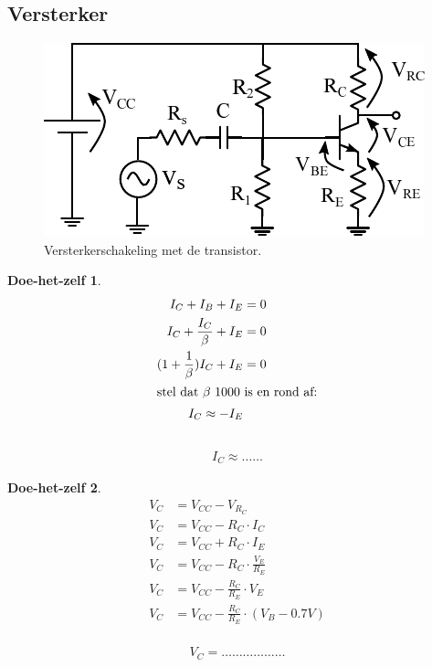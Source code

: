 \documentclass{article}
\newtheorem{DIY}{Doe-het-zelf}
\begin{document}
\subsection{Versterker}
		\begin{figure}[h!]
					\centering
					\includegraphics{ges}
					\caption{Versterkerschakeling met de transistor.}
					\label{fig:ges}
				\end{figure}
			\begin{DIY}	
				\ifoplossing
					\begin{align*}
					    I_C + I_B + I_E &= 0 \\
					    I_C + \frac{I_C}{\beta} + I_E &= 0 \\
					    (1+\frac{1}{\beta})I_C +I_E &= 0\\
						\intertext{stel dat $\beta$ 1000 is en rond af:}   
						I_C \approx -I_E \\
					\end{align*}
				\else
					~\vspace*{20ex}
					\begin{align*}
						I_C \approx \ldots \ldots
					\end{align*}
				\fi


			\end{DIY}


			\begin{DIY} 
				\ifoplossing
					\begin{align*}
					    V_C &= V_{CC} - V_{R_C} \\
					    V_C &= V_{CC} - R_C \cdot I_C \\
					    V_C &= V_{CC} + R_C \cdot I_E \\
					    V_C &= V_{CC} - R_C \cdot \frac{V_E}{R_E} \\
					    V_C &= V_{CC} - \frac{R_C}{R_E} \cdot V_E \\
					    V_C &= V_{CC} - \frac{R_C}{R_E} \cdot(V_B - 0.7 V) 
					\end{align*}
				\else
					~\vspace*{60ex}
					\begin{align}
					    V_C = \ldots \ldots \ldots \ldots  \ldots  \ldots 
					\end{align}
				\fi

			\end{DIY}
\end{document}

